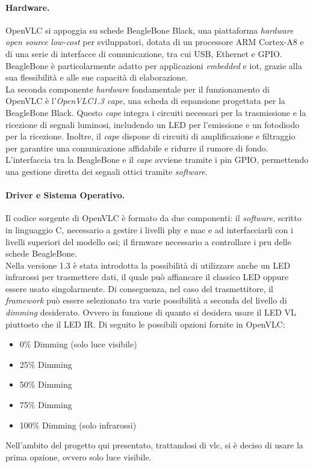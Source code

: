 \paragraph{Hardware.}
OpenVLC si appoggia su schede BeagleBone Black, una piattaforma \textit{hardware} \textit{open source} \textit{low-cost} per sviluppatori, dotata di un processore ARM Cortex-A8 e di una serie di interfacce di comunicazione, tra cui USB, Ethernet e GPIO. BeagleBone è particolarmente adatto per applicazioni \textit{embedded} e \gls{iot}, grazie alla sua flessibilità e alle sue capacità di elaborazione.\\
La seconda componente \textit{hardware} fondamentale per il funzionamento di OpenVLC è l'\textit{OpenVLC1.3 cape}, una scheda di espansione progettata per la BeagleBone Black. Questo \textit{cape} integra i circuiti necessari per la trasmissione e la ricezione di segnali luminosi, includendo un LED per l'emissione e un fotodiodo per la ricezione. Inoltre, il \textit{cape} dispone di circuiti di amplificazione e filtraggio per garantire una comunicazione affidabile e ridurre il rumore di fondo. L'interfaccia tra la BeagleBone e il \textit{cape} avviene tramite i pin GPIO, permettendo una gestione diretta dei segnali ottici tramite \textit{software}.

\paragraph{Driver e Sistema Operativo.}
Il codice sorgente di OpenVLC è formato da due componenti: il \textit{software}, scritto in linguaggio C, necessario a gestire i livelli \gls{phy} e \gls{mac} e ad interfacciarli con i livelli superiori del modello \gls{osi}; il firmware necessario a controllare i \gls{pru} delle schede BeagleBone.\\
Nella versione 1.3 è stata introdotta la possibilità di utilizzare anche un LED infrarossi per trasmettere dati, il quale può affiancare il classico LED oppure essere usato singolarmente.
Di conseguenza, nel caso del trasmettitore, il \textit{framework} può essere selezionato tra varie possibilità a seconda del livello di \textit{dimming} desiderato. Ovvero in funzione di quanto si desidera usare il LED VL piuttosto che il LED IR.
Di seguito le possibili opzioni fornite in OpenVLC:
\begin{itemize}
    \item 0\% Dimming (solo luce visibile)
    \item 25\% Dimming
    \item 50\% Dimming
    \item 75\% Dimming
    \item 100\% Dimming (solo infrarossi)
\end{itemize}
Nell'ambito del progetto qui presentato, trattandosi di \gls{vlc}, si è deciso di usare la prima opzione, ovvero solo luce visibile.

